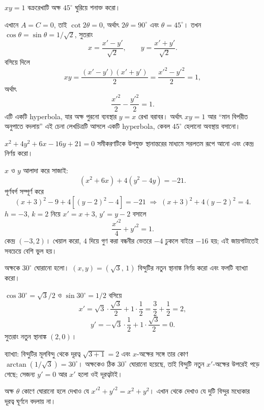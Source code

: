 \documentclass[11pt]{article}
\begin{document}
\begin{example}
$xy = 1$ বক্ররেখাটি অক্ষ $45^{\circ}$ ঘুরিয়ে শনাক্ত করো।
\end{example}

\begin{solbox}
এখানে $A = C = 0$, তাই $\cot 2\theta = 0$, অর্থাৎ $2\theta = 90^{\circ}$ এবং
$\theta = 45^{\circ}$। তখন $\cos\theta = \sin\theta = 1/\sqrt{2}$, সুতরাং
\[
  x = \frac{x'-y'}{\sqrt{2}}, \qquad y = \frac{x'+y'}{\sqrt{2}} .
\]
বসিয়ে দিলে
\[
  xy = \frac{(x'-y')(x'+y')}{2} = \frac{x'^{2}-y'^{2}}{2} = 1 ,
\]
অর্থাৎ
\[
  \frac{x'^{2}}{2} - \frac{y'^{2}}{2} = 1 .
\]
এটি একটি hyperbola, যার অক্ষ পুরনো ব্যবস্থার $y = x$ রেখা বরাবর। অর্থাৎ
$xy = 1$ আর ``মান বিপরীত অনুপাতে বদলায়'' এই চেনা লেখচিত্রটি আসলে একটি
hyperbola, কেবল $45^{\circ}$ হেলানো অবস্থায় বসানো।
\end{solbox}

 $x^{2} + 4y^{2} + 6x - 16y + 21 = 0$ সমীকরণটিকে উপযুক্ত স্থানান্তরের
মাধ্যমে সরলতম রূপে আনো এবং কেন্দ্র নির্ণয় করো।

\begin{sol}
$x$ ও $y$ আলাদা করে সাজাই:
\[
  (x^{2}+6x) + 4(y^{2}-4y) = -21 .
\]
পূর্ণবর্গ সম্পূর্ণ করে
\[
  (x+3)^{2} - 9 + 4\left[ (y-2)^{2} - 4 \right] = -21
  \;\Longrightarrow\; (x+3)^{2} + 4(y-2)^{2} = 4 .
\]
$h = -3$, $k = 2$ নিয়ে $x' = x+3$, $y' = y-2$ বসালে
\[
  \frac{x'^{2}}{4} + y'^{2} = 1 .
\]
কেন্দ্র $(-3, 2)$। খেয়াল করো, $4$ দিয়ে গুণ করা বন্ধনীর ভেতরে $-4$ ঢুকলে বাইরে
$-16$ হয়; এই জায়গাটাতেই সবচেয়ে বেশি ভুল হয়।
\end{sol}

 অক্ষকে $30^{\circ}$ ঘোরানো হলো। $(x,y) = (\sqrt{3},\,1)$ বিন্দুটির নতুন
স্থানাঙ্ক নির্ণয় করো এবং ফলটি ব্যাখ্যা করো।

\begin{sol}
$\cos 30^{\circ} = \sqrt{3}/2$ ও $\sin 30^{\circ} = 1/2$ বসিয়ে
\[
  x' = \sqrt{3}\cdot\frac{\sqrt{3}}{2} + 1\cdot\frac{1}{2}
     = \frac{3}{2} + \frac{1}{2} = 2 ,
\]
\[
  y' = -\sqrt{3}\cdot\frac{1}{2} + 1\cdot\frac{\sqrt{3}}{2} = 0 .
\]
সুতরাং নতুন স্থানাঙ্ক $(2,0)$।

ব্যাখ্যা: বিন্দুটির মূলবিন্দু থেকে দূরত্ব $\sqrt{3+1} = 2$ এবং $x$-অক্ষের সঙ্গে
তার কোণ $\arctan(1/\sqrt{3}) = 30^{\circ}$। অক্ষকেও ঠিক $30^{\circ}$ ঘোরানো
হয়েছে, তাই বিন্দুটি নতুন $x'$-অক্ষের উপরেই পড়ে গেছে; সেজন্য $y' = 0$ আর
$x'$ হলো ওই দূরত্বটাই।
\end{sol}

 অক্ষ $\theta$ কোণে ঘোরানো হলে দেখাও যে
$x'^{2} + y'^{2} = x^{2} + y^{2}$। এখান থেকে দেখাও যে দুটি বিন্দুর মধ্যেকার
দূরত্ব ঘূর্ণনে বদলায় না।
\end{document}
